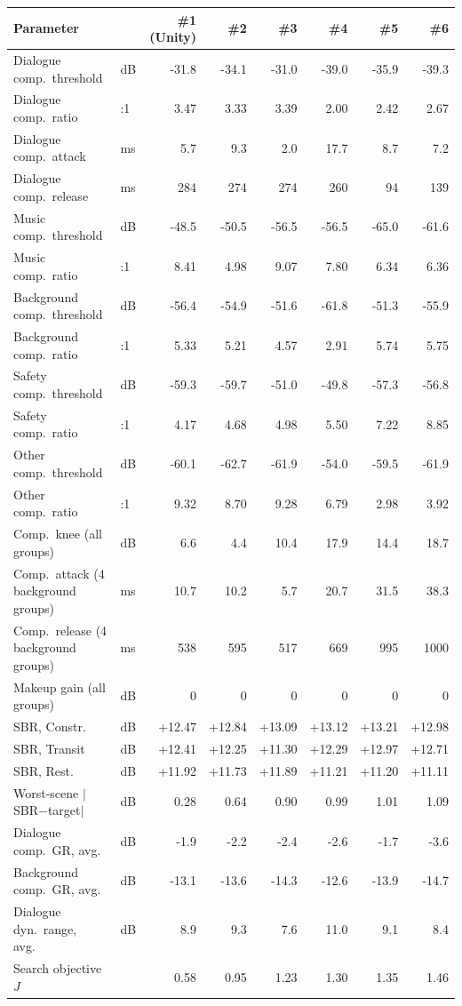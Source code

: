 \documentclass[11pt]{article}
\begin{document}
\begin{table}[H]\centering\scriptsize
\begin{tabular}{@{}l l rrrrrr@{}}
\toprule
\textbf{Parameter} & & \textbf{\#1} \textbf{(Unity)} & \textbf{\#2} & \textbf{\#3} & \textbf{\#4} & \textbf{\#5} & \textbf{\#6} \\
\midrule
Dialogue comp.\ threshold & dB & -31.8 & -34.1 & -31.0 & -39.0 & -35.9 & -39.3 \\
Dialogue comp.\ ratio & :1 & 3.47 & 3.33 & 3.39 & 2.00 & 2.42 & 2.67 \\
Dialogue comp.\ attack & ms & 5.7 & 9.3 & 2.0 & 17.7 & 8.7 & 7.2 \\
Dialogue comp.\ release & ms & 284 & 274 & 274 & 260 & 94 & 139 \\
Music comp.\ threshold & dB & -48.5 & -50.5 & -56.5 & -56.5 & -65.0 & -61.6 \\
Music comp.\ ratio & :1 & 8.41 & 4.98 & 9.07 & 7.80 & 6.34 & 6.36 \\
Background comp.\ threshold & dB & -56.4 & -54.9 & -51.6 & -61.8 & -51.3 & -55.9 \\
Background comp.\ ratio & :1 & 5.33 & 5.21 & 4.57 & 2.91 & 5.74 & 5.75 \\
Safety comp.\ threshold & dB & -59.3 & -59.7 & -51.0 & -49.8 & -57.3 & -56.8 \\
Safety comp.\ ratio & :1 & 4.17 & 4.68 & 4.98 & 5.50 & 7.22 & 8.85 \\
Other comp.\ threshold & dB & -60.1 & -62.7 & -61.9 & -54.0 & -59.5 & -61.9 \\
Other comp.\ ratio & :1 & 9.32 & 8.70 & 9.28 & 6.79 & 2.98 & 3.92 \\
Comp.\ knee (all groups) & dB & 6.6 & 4.4 & 10.4 & 17.9 & 14.4 & 18.7 \\
Comp.\ attack (4 background groups) & ms & 10.7 & 10.2 & 5.7 & 20.7 & 31.5 & 38.3 \\
Comp.\ release (4 background groups) & ms & 538 & 595 & 517 & 669 & 995 & 1000 \\
Makeup gain (all groups) & dB & 0 & 0 & 0 & 0 & 0 & 0 \\
\midrule
SBR, Constr. & dB & +12.47 & +12.84 & +13.09 & +13.12 & +13.21 & +12.98 \\
SBR, Transit & dB & +12.41 & +12.25 & +11.30 & +12.29 & +12.97 & +12.71 \\
SBR, Rest. & dB & +11.92 & +11.73 & +11.89 & +11.21 & +11.20 & +11.11 \\
Worst-scene $|$SBR$-$target$|$ & dB & 0.28 & 0.64 & 0.90 & 0.99 & 1.01 & 1.09 \\
Dialogue comp.\ GR, avg.\ & dB & -1.9 & -2.2 & -2.4 & -2.6 & -1.7 & -3.6 \\
Background comp.\ GR, avg.\ & dB & -13.1 & -13.6 & -14.3 & -12.6 & -13.9 & -14.7 \\
Dialogue dyn.\ range, avg.\ & dB & 8.9 & 9.3 & 7.6 & 11.0 & 9.1 & 8.4 \\
Search objective $J$ & & 0.58 & 0.95 & 1.23 & 1.30 & 1.35 & 1.46 \\
\bottomrule
\end{tabular}
\end{table}
\end{document}
